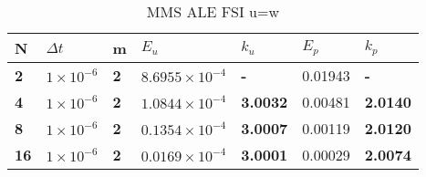 \begin{table}[H]
\centering
\caption{MMS ALE FSI u=w}
\label{my-label}
\begin{tabular}{|l|l|l|l|l|l|l|}
\hline
\textbf{N}  & $\Delta t$ & \textbf{m} & $E_u$                   & \textbf{$k_u$}  & $E_p$   & \textbf{$k_p$}  \\ \hline
\textbf{2}  & $1 \times 10^{-6}$ & \textbf{2} & $8.6955 \times 10^{-4}$ & \textbf{-}      & 0.01943 & \textbf{-}      \\ \hline
\textbf{4}  & $1 \times 10^{-6}$ & \textbf{2} & $1.0844 \times 10^{-4}$ & \textbf{3.0032} & 0.00481 & \textbf{2.0140} \\ \hline
\textbf{8}  & $1 \times 10^{-6}$ & \textbf{2} & $0.1354 \times 10^{-4}$ & \textbf{3.0007} & 0.00119 & \textbf{2.0120} \\ \hline
\textbf{16} & $1 \times 10^{-6}$ & \textbf{2} & $0.0169 \times 10^{-4}$ & \textbf{3.0001} & 0.00029 & \textbf{2.0074} \\ \hline
\end{tabular}
\end{table}





